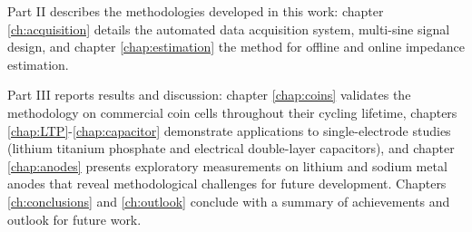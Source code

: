 Part II describes the methodologies developed in this work: chapter \ref{ch:acquisition} details the automated data acquisition system, multi-sine signal design, and chapter \ref{chap:estimation} the method for offline and online impedance estimation.

Part III reports results and discussion: chapter \ref{chap:coins} validates the methodology on commercial coin cells throughout their cycling lifetime, chapters \ref{chap:LTP}-\ref{chap:capacitor} demonstrate applications to single-electrode studies (lithium titanium phosphate and electrical double-layer capacitors), and chapter \ref{chap:anodes} presents exploratory measurements on lithium and sodium metal anodes that reveal methodological challenges for future development. Chapters \ref{ch:conclusions} and \ref{ch:outlook} conclude with a summary of achievements and outlook for future work.
